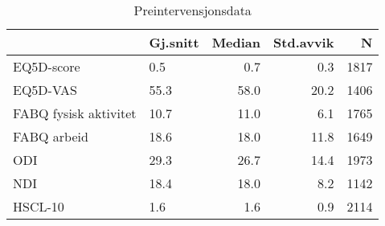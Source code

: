 \documentclass[norsk,a4paper]{article}\usepackage[]{graphicx}\usepackage[]{color}
\begin{document}
\begin{table}[ht]
\centering
\begin{tabular}{llrrr}
  \hline
 & Gj.snitt & Median & Std.avvik & N \\ 
  \hline
EQ5D-score & 0.5 & 0.7 & 0.3 & 1817 \\ 
  EQ5D-VAS & 55.3 & 58.0 & 20.2 & 1406 \\ 
  FABQ fysisk aktivitet & 10.7 & 11.0 & 6.1 & 1765 \\ 
  FABQ arbeid & 18.6 & 18.0 & 11.8 & 1649 \\ 
  ODI & 29.3 & 26.7 & 14.4 & 1973 \\ 
  NDI & 18.4 & 18.0 & 8.2 & 1142 \\ 
  HSCL-10 & 1.6 & 1.6 & 0.9 & 2114 \\ 
   \hline
\end{tabular}
\caption{Preintervensjonsdata} 
\end{table}
\end{document}
